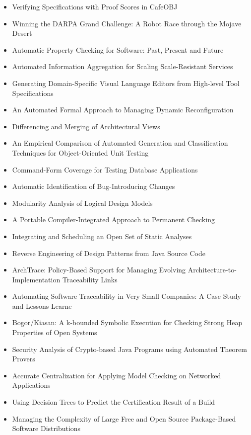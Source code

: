 {\small
\begin{itemize}[itemsep=-1ex]
  \item Verifying Specifications with Proof Scores in CafeOBJ
  \item Winning the DARPA Grand Challenge: A Robot Race through the Mojave Desert
  \item Automatic Property Checking for Software: Past, Present and Future
  \item Automated Information Aggregation for Scaling Scale-Resistant Services
  \item Generating Domain-Specific Visual Language Editors from High-level Tool Specifications
  \item An Automated Formal Approach to Managing Dynamic Reconfiguration
  \item Differencing and Merging of Architectural Views
  \item An Empirical Comparison of Automated Generation and Classification Techniques for Object-Oriented Unit Testing
  \item Command-Form Coverage for Testing Database Applications
  \item Automatic Identification of Bug-Introducing Changes
  \item Modularity Analysis of Logical Design Models
  \item A Portable Compiler-Integrated Approach to Permanent Checking
  \item Integrating and Scheduling an Open Set of Static Analyses
  \item Reverse Engineering of Design Patterns from Java Source Code
  \item ArchTrace: Policy-Based Support for Managing Evolving Architecture-to-Implementation Traceability Links
  \item Automating Software Traceability in Very Small Companies: A Case Study and Lessons Learne
  \item Bogor/Kiasan: A k-bounded Symbolic Execution for Checking Strong Heap Properties of Open Systems
  \item Security Analysis of Crypto-based Java Programs using Automated Theorem Provers
  \item Accurate Centralization for Applying Model Checking on Networked Applications
  \item Using Decision Trees to Predict the Certification Result of a Build
  \item Managing the Complexity of Large Free and Open Source Package-Based Software Distributions

\end{itemize}}
